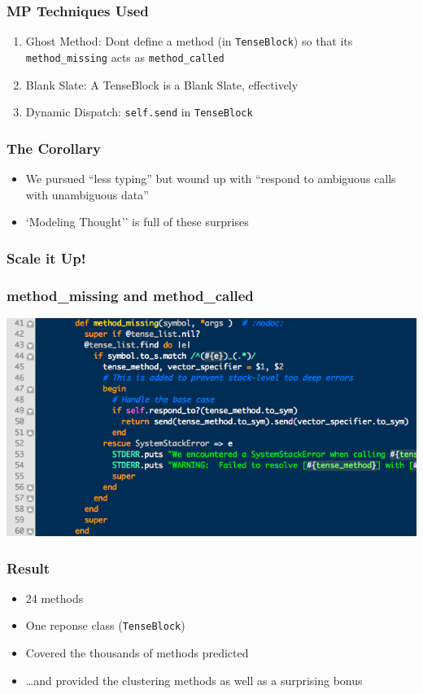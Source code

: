 \documentclass[slidestop,compress,mathserif]{beamer}
\begin{document}
\begin{frame}
	\frametitle{MP Techniques Used}
	\begin{enumerate}
		\item Ghost Method:  Dont define a method (in \texttt{TenseBlock}) so that its \texttt{method\_missing} acts as \texttt{method\_called}
		\item Blank Slate:  A TenseBlock is a Blank Slate, effectively
		\item Dynamic Dispatch:  \texttt{self.send} in \texttt{TenseBlock}
	\end{enumerate}
\end{frame}

\begin{frame}
	\frametitle{The Corollary}
	\begin{itemize}
		\item 	We pursued ``less typing'' but wound up with ``respond to ambiguous calls with unambiguous data''
		\pause
		\item 	`Modeling Thought'' is full of these surprises
	\end{itemize}
\end{frame}

\begin{frame}
	\frametitle{Scale it Up!}
	\frametitle{method\_missing and method\_called}
	\includegraphics[scale=0.45]{img/lv_mm.png}	
\end{frame}

\begin{frame}
	\frametitle{Result}
	\begin{itemize}
		\item 24 methods
		\item One reponse class (\texttt{TenseBlock})
		\item Covered the thousands of methods predicted
		\item \ldots and provided the clustering methods as well as a surprising bonus
	\end{itemize}
\end{frame}
\end{document}
